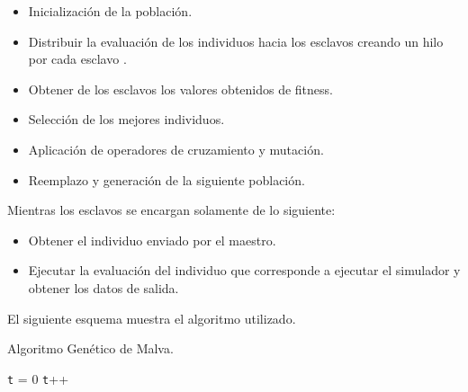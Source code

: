 \begin{itemize}
\item Inicialización de la población.
\item Distribuir la evaluación de los individuos hacia los esclavos creando un hilo por cada esclavo	.
\item Obtener de los esclavos los valores obtenidos de fitness.
\item Selección de los mejores individuos.
\item Aplicación de operadores de cruzamiento y mutación.
\item Reemplazo y generación de la siguiente población.
\end{itemize}

Mientras los esclavos se encargan solamente de lo siguiente:
\begin{itemize}
	\item Obtener el individuo enviado por el maestro.
	\item Ejecutar la evaluación del individuo que corresponde a ejecutar el simulador y obtener los datos de salida.
\end{itemize}


El siguiente esquema muestra el algoritmo utilizado. 

\begin{algorithm}[H]
	\caption{Algoritmo Genético de Malva. }
	\label{alg:algoritmo_genetico_malva}
	\begin{algorithmic} [1] 
		{
			\STATE \texttt{t} = 0
			\STATE \texttt{t}++		
			\ENDWHILE
		}
	\end{algorithmic}
	
\end{algorithm}

